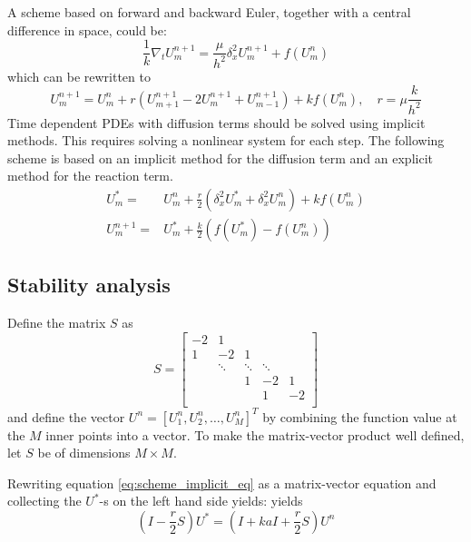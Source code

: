 A scheme based on forward and backward Euler,
together with a central difference in space, could be:
$$
  \frac{1}{k}\nabla_tU_{m}^{n+1}=\frac{\mu}{h^2}\delta_x^2U_{m}^{n+1}+f(U_{m}^{n} )
$$
which can be rewritten to 
$$
  U_{m}^{n+1} = U_{m}^{n} + r (U_{m+1}^{n+1}-2U_{m}^{n+1}+U_{m-1}^{n+1}) + kf(U_{m}^{n}), \quad r = \mu\frac{k}{h^2}
$$
Time dependent PDEs with diffusion terms should be solved using implicit methods.
This requires solving a nonlinear system for each step.
The following scheme is based on an implicit method
for the diffusion term and an explicit method for the reaction term.
\begin{align}
  \label{eq:scheme_implicit_eq}
    U_{m}^{*} =& U_{m}^{n} +\frac{r}{2}(\delta_x^2 U_{m}^{*} + \delta_x^2 U_{m}^{n} ) + kf(U_{m}^{n}) \\
  \label{eq:scheme_explicit_eq}
    U_{m}^{n+1} =& U_{m}^{*} + \frac{k}{2}(f(U_{m}^{*}) - f(U_{m}^{n}))
\end{align}

\subsection{Stability analysis}

Define the matrix \( S \) as
\[
  S = 
  \begin{bmatrix}
  -2 & 1 &  &  & \\
   1& -2 & 1 &  & \\
   & \ddots & \ddots & \ddots & \\
   &  & 1 & -2 & 1\\
   &  &  & 1 & -2\\
  \end{bmatrix}
\]
and define the vector \( U^n = [U_1^n, U_2^n, \dots, U_M^n]^T \)
by combining the function value at the \( M \) inner points into a vector.
To make the matrix-vector product well defined, let \( S \) be of dimensions
\( M \times M \).

Rewriting equation \ref{eq:scheme_implicit_eq} as a matrix-vector equation
and collecting the \( U^* \)-s on the left hand side yields:
yields
\begin{equation}
  (I - \frac{r}{2}S)U^* = (I + kaI + \frac{r}{2}S) U^n
\end{equation}

